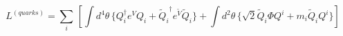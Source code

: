 \begin{equation}   { L}^{(quarks)}= \sum_i \, [ \int d^4 \theta \, \{ Q_i^{\dagger} e^V
Q_i + {\tilde Q_i}^{\dagger}  e^{ {\tilde V}}    {\tilde Q}_i \} +
\int d^2 \theta 
\, \{ \sqrt{2} {\tilde Q}_i \Phi Q^i    +      m_i   {\tilde Q}_i    Q^i   \}]
\end{equation}

